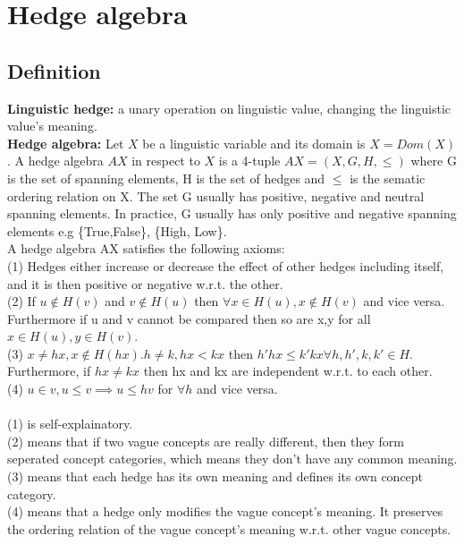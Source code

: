 \documentclass[part1.tex]{subfiles}
\begin{document}
\section{Hedge algebra}
\subsection{Definition}
{\bfseries Linguistic hedge:} a unary operation on linguistic value, changing the linguistic value's meaning.
\\
{\bfseries Hedge algebra:} Let \(X\) be a linguistic variable and its domain is \(X = Dom(X)\). A hedge 
algebra \(AX\) in respect to \(X\) is a 4-tuple \(AX = (X,G,H,\le)\) where G is the set of spanning
elements, H is the set of hedges and \(\le\) is the sematic ordering relation on X.
The set G usually has positive, negative and neutral spanning elements. In practice, G usually has only
positive and negative spanning elements e.g \{True,False\}, \{High, Low\}.\\

A hedge algebra AX satisfies the following  axioms:\\
{\indent
	(1) Hedges either increase or decrease the effect of other hedges including itself, and it is 
then positive or negative w.r.t. the other.\\}
{\indent
	(2) If \(u\notin H(v)\) and \(v\notin H(u)\) then \(\forall x\in H(u), x\notin H(v)\) and vice versa. 
	Furthermore if u and v cannot be compared then so are x,y for all \(x\in H(u), y\in H(v)\).
}\\
{\indent
	(3) \(x \not = hx, x \notin H(hx). h\neq k, hx<kx\) then \(h'hx\le k'kx\forall h,h',k,k'\in
	H.\) Furthermore, if \(hx \neq kx\) then hx and kx are independent w.r.t. to each other.
}\\
{\indent
	(4) \(u \in v, u \le v\implies u\le hv\) for \(\forall h\) and vice versa.
}
\\\\
(1) is self-explainatory.\\
(2) means that if two vague concepts are really different, then they form seperated concept categories,
which means they don't have any common meaning.\\
(3) means that each hedge has its own meaning and defines its own concept category.\\
(4) means that a hedge only modifies the vague concept's meaning. It preserves the ordering relation
of the vague concept's meaning w.r.t. other vague concepts.\\
\end{document}
